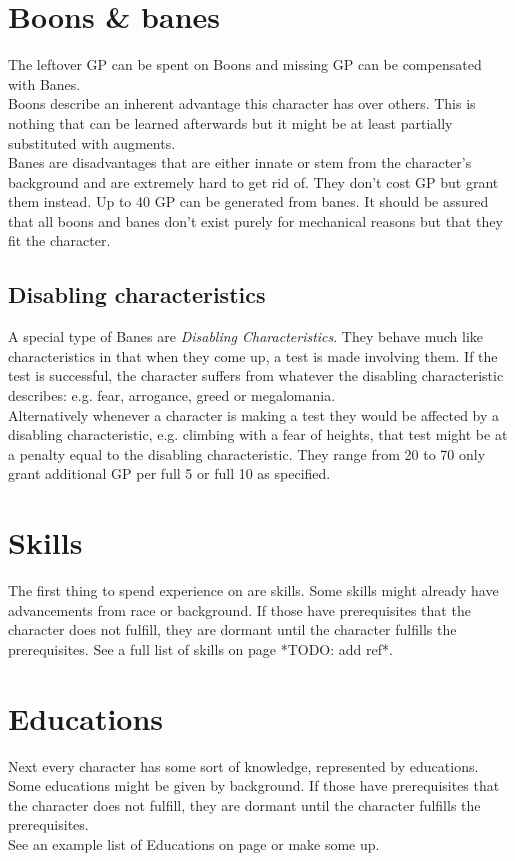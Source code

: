\documentclass[12pt,a4paper]{book}
\begin{document}
	\section{Boons \& banes}
	The leftover GP can be spent on Boons and missing GP can be compensated with Banes.\\
	Boons describe an inherent advantage this character has over others. This is nothing that can be learned afterwards but it might be at least partially substituted with augments.\\
	Banes are disadvantages that are either innate or stem from the character’s background and are extremely hard to get rid of. They don’t cost GP but grant them instead. Up to 40 GP can be generated from banes. It should be assured that all boons and banes don’t exist purely for mechanical reasons but that they fit the character.
	\subsection{Disabling characteristics}
	A special type of Banes are \textit{Disabling Characteristics}. They behave much like characteristics in that when they come up, a test is made involving them. If the test is successful, the character suffers from whatever the disabling characteristic describes: e.g. fear, arrogance, greed or megalomania.\\
	Alternatively whenever a character is making a test they would be affected by a disabling characteristic, e.g. climbing with a fear of heights, that test might be at a penalty equal to the disabling characteristic. They range from 20 to 70 only grant additional GP per full 5 or full 10 as specified.
	\section{Skills}
	The first thing to spend experience on are skills. Some skills might already have advancements from race or background. If those have prerequisites that the character does not fulfill, they are dormant until the character fulfills the prerequisites. See a full list of skills on page *TODO: add ref*. 
	\section{Educations}
	Next every character has some sort of knowledge, represented by educations. Some educations might be given by background. If those have prerequisites that the character does not fulfill, they are dormant until the character fulfills the prerequisites.\\
	See an example list of Educations on page \pageref{eds-explanation} or make some up. 
\end{document}

